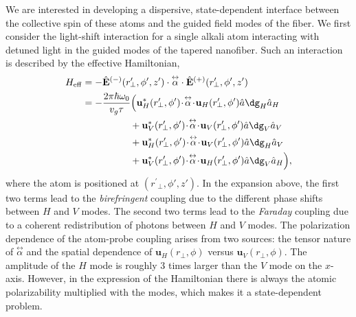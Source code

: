 \documentclass[]{report}
\newcommand{\tensor}[1]{\overset{\leftrightarrow}{#1}} %
\begin{document}
We are interested in developing a dispersive, state-dependent interface between the collective spin of these atoms and the guided field modes of the fiber.  We first consider the light-shift interaction for a single alkali atom interacting with detuned light in the guided modes of the tapered nanofiber.  Such an interaction is described by the effective Hamiltonian,
\begin{align}  \label{Eq::LightShiftHam}
	H_{\rm eff}   &= -\hat{\mathbf{E}}^{(-)}(r^\prime\!\!_\perp,\phi',z')\cdot \tensor{\alpha}\cdot \hat{\mathbf{E}}^{(+)}(r^\prime\!\!_\perp,\phi',z')\\
	&= -\frac{2\pi \hbar \omega_0}{ v_g\tau} \Big( \mathbf{u}^*_H(r^\prime\!\!_\perp, \phi')\! \cdot\! \tensor{\alpha}\! \cdot\! \mathbf{u}_{H}(r^\prime\!\!_\perp, \phi') \hat{a}\dg_H \hat{a}_H \nonumber\\
	&\quad\quad\quad\quad\quad +  \mathbf{u}^*_V(r^\prime\!\!_\perp, \phi') \!\cdot\! \tensor{\alpha}\! \cdot\! \mathbf{u}_{V}(r^\prime\!\!_\perp, \phi') \hat{a}\dg_V \hat{a}_V \\
	&\quad\quad\quad\quad\quad + \mathbf{u}^*_H(r^\prime\!\!_\perp, \phi') \!\cdot\! \tensor{\alpha}\! \cdot\! \mathbf{u}_{V}(r^\prime\!\!_\perp, \phi') \hat{a}\dg_H \hat{a}_V \nonumber\\
	&\quad\quad\quad\quad\quad + \mathbf{u}^*_V(r^\prime\!\!_\perp, \phi') \!\cdot\! \tensor{\alpha}\! \cdot\! \mathbf{u}_{H}(r^\prime\!\!_\perp, \phi') \hat{a}\dg_V \hat{a}_H \Big), \nonumber 
\end{align}
where the atom is positioned at $ (r^\prime\!\!_\perp,\phi',z') $. 
In the expansion above, the first two terms lead to the \textit{birefringent} coupling due to the different phase shifts between $ H $ and $ V $ modes. The second two terms lead to the \textit{Faraday} coupling due to a coherent redistribution of photons between $ H $ and $ V $ modes. The polarization dependence of the atom-probe coupling arises from two sources: the tensor nature of $ \tensor{\alpha} $ and the spatial dependence of $ \mathbf{u}_{H}(r\!_\perp, \phi) $ versus $ \mathbf{u}_{V}(r\!_\perp, \phi) $. The amplitude of the $ H $ mode is roughly $ 3 $ times larger than the $ V $ mode on the $ x $-axis. However, in the expression of the Hamiltonian there is always the atomic polarizability multiplied with the modes, which makes it a state-dependent problem. 
\end{document}
